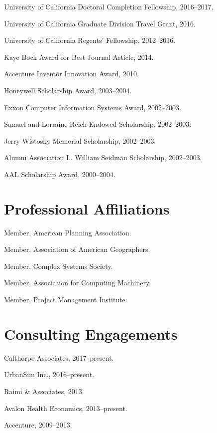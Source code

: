 \documentclass[11pt,letterpaper]{report}
\renewenvironment{itemize}{
  \begin{list}{}{
      \setlength{\leftmargin}{1.75em}
      \setlength{\itemsep}{0.25em}
      \setlength{\parskip}{0em}
      \setlength{\parsep}{0.25em}
    }
}{
  \end{list}
}
\begin{document}
\begin{itemize}
\item University of California Doctoral Completion Fellowship, 2016--2017.
\item University of California Graduate Division Travel Grant, 2016.
\item University of California Regents' Fellowship, 2012--2016.
\item Kaye Bock Award for Best Journal Article, 2014.
\item Accenture Inventor Innovation Award, 2010.
\item Honeywell Scholarship Award, 2003--2004.
\item Exxon Computer Information Systems Award, 2002--2003.
\item Samuel and Lorraine Reich Endowed Scholarship, 2002--2003.
\item Jerry Wistosky Memorial Scholarship, 2002--2003.
\item Alumni Association L. William Seidman Scholarship, 2002--2003.
\item AAL Scholarship Award, 2000--2004.
\end{itemize}



\section*{Professional Affiliations}

\begin{itemize}
\item Member, American Planning Association.
\item Member, Association of American Geographers.
\item Member, Complex Systems Society.
\item Member, Association for Computing Machinery.
\item Member, Project Management Institute.
\end{itemize}



\section*{Consulting Engagements}

\begin{itemize}
\item Calthorpe Associates, 2017--present.
\item UrbanSim Inc., 2016--present.
\item Raimi \& Associates, 2013.
\item Avalon Health Economics, 2013--present.
\item Accenture, 2009--2013.
\end{itemize}
\end{document}
